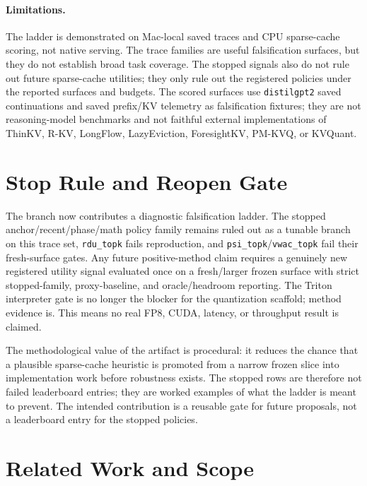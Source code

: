 \documentclass{article}
\begin{document}
\paragraph{Limitations.}
The ladder is demonstrated on Mac-local saved traces and CPU sparse-cache
scoring, not native serving. The trace families are useful falsification
surfaces, but they do not establish broad task coverage. The stopped signals
also do not rule out future sparse-cache utilities; they only rule out the
registered policies under the reported surfaces and budgets.
The scored surfaces use \texttt{distilgpt2} saved continuations and saved
prefix/KV telemetry as falsification fixtures; they are not reasoning-model benchmarks
and not faithful external implementations of ThinKV, R-KV,
LongFlow, LazyEviction, ForesightKV, PM-KVQ, or KVQuant.

\section{Stop Rule and Reopen Gate}

The branch now contributes a diagnostic falsification ladder. The stopped
anchor/recent/phase/math policy family remains ruled out as a tunable branch on this trace set,
\texttt{rdu\_topk} fails reproduction, and \texttt{psi\_topk}/\texttt{vwac\_topk}
fail their fresh-surface gates. Any future positive-method claim requires a genuinely new
registered utility signal evaluated once on a fresh/larger frozen surface
with strict stopped-family, proxy-baseline, and oracle/headroom reporting. The Triton
interpreter gate is no longer the blocker for the quantization scaffold; method
evidence is. This means no real FP8, CUDA, latency, or throughput result is claimed.

The methodological value of the artifact is procedural: it reduces the chance that a
plausible sparse-cache heuristic is promoted from a narrow frozen slice into
implementation work before robustness exists. The stopped rows are therefore
not failed leaderboard entries; they are worked examples of what the ladder is
meant to prevent.
The intended contribution is a reusable gate for future proposals, not a
leaderboard entry for the stopped policies.

\section{Related Work and Scope}
\end{document}
